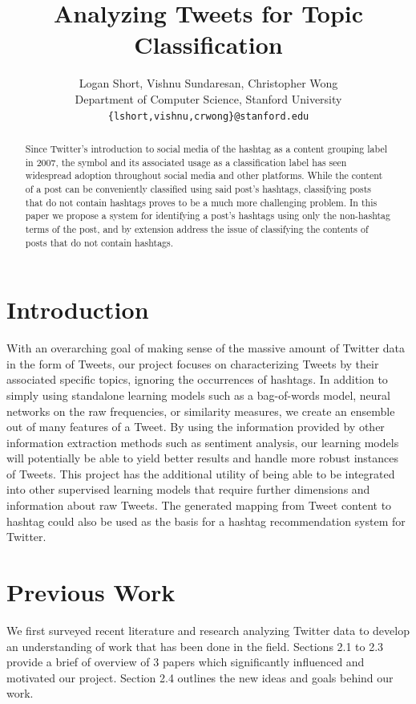 \documentclass[11pt]{article}
\title{Analyzing Tweets for Topic Classification}
\author{Logan Short, Vishnu Sundaresan, Christopher Wong \\
  Department of Computer Science, Stanford University \\
  {\tt \{lshort,vishnu,crwong\}@stanford.edu}}
\date{}
\begin{document}
\maketitle
\begin{abstract}
Since Twitter's introduction to social media of the hashtag as a content grouping label in 2007, the symbol and its associated usage as a classification label has seen widespread adoption throughout social media and other platforms. While the content of a post can be conveniently classified using said post's hashtags, classifying posts that do not contain hashtags proves to be a much more challenging problem. In this paper we propose a system for identifying a post's hashtags using only the non-hashtag terms of the post, and by extension address the issue of classifying the contents of posts that do not contain hashtags.
\end{abstract}

\section{Introduction}

With an overarching goal of making sense of the massive amount of Twitter data in the form of Tweets, our project focuses on characterizing Tweets by their associated specific topics, ignoring the occurrences of hashtags. In addition to simply using standalone learning models such as a bag-of-words model, neural networks on the raw frequencies, or similarity measures, we create an ensemble out of many features of a Tweet. By using the information provided by other information extraction methods such as sentiment analysis, our learning models will potentially be able to yield better results and handle more robust instances of Tweets. This project has the additional utility of being able to be integrated into other supervised learning models that require further dimensions and information about raw Tweets. The generated mapping from Tweet content to hashtag could also be used as the basis for a hashtag recommendation system for Twitter.

\section{Previous Work}

We first surveyed recent literature and research analyzing Twitter data to develop an understanding of work that has been done in the field. Sections 2.1 to 2.3 provide a brief of overview of 3 papers which significantly influenced and motivated our project. Section 2.4 outlines the new ideas and goals behind our work.
\end{document}
